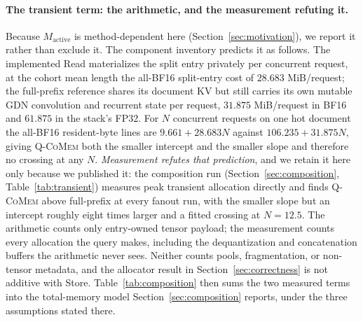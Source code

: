 \documentclass{article}
\newcommand{\qcomem}{\textsc{Q-CoMem}}
\begin{document}
\paragraph{The transient term: the arithmetic, and the measurement refuting it.}
Because $M_{\mathrm{active}}$ is method-dependent here
(Section~\ref{sec:motivation}), we report it rather than exclude it.  The
component inventory predicts it as follows.  The implemented Read materializes
the split entry privately per concurrent request, at the cohort mean length the
all-BF16 split-entry cost of $28.683$ MiB/request; the full-prefix reference
shares its document KV but still carries its own mutable GDN convolution and
recurrent state per request, $31.875$ MiB/request in BF16 and $61.875$ in the
stack's FP32.  For $N$ concurrent requests on one hot document the all-BF16
resident-byte lines are $9.661+28.683N$ against $106.235+31.875N$, giving
\qcomem{} both the smaller intercept and the smaller slope and therefore no
crossing at any $N$.  \emph{Measurement refutes that prediction}, and we retain
it here only because we published it: the composition run
(Section~\ref{sec:composition}, Table~\ref{tab:transient}) measures peak
transient allocation directly and finds \qcomem{} above full-prefix at every
fanout run, with the smaller slope but an intercept roughly eight times larger
and a fitted crossing at $N=12.5$.  The arithmetic counts only entry-owned
tensor payload; the measurement counts every allocation the query makes,
including the dequantization and concatenation buffers the arithmetic never
sees.  Neither counts pools, fragmentation, or non-tensor metadata, and the
allocator result in Section~\ref{sec:correctness} is not additive with Store.
Table~\ref{tab:composition} then sums the two measured terms into the
total-memory model Section~\ref{sec:composition} reports, under the three
assumptions stated there.




\end{document}
